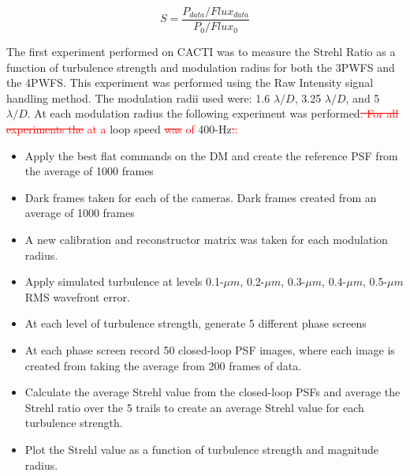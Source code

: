 \documentclass[12pt]{spieman}  %
\newcommand{\jrmadd}[1]{\textcolor{red}{#1}}
\newcommand{\jrmrmv}[1]{\textcolor{red}{\sout{#1}}}
\begin{document}
\begin{spacing}{2}
\begin{equation}
    S=\frac{P_{data}/Flux_{data}}{P_{0}/Flux_{0}}
    \label{Strehl}
\end{equation}

The first experiment performed on CACTI was to measure the Strehl Ratio as a function of turbulence strength and modulation radius for both the 3PWFS and the 4PWFS.  This experiment was performed using the Raw Intensity signal handling method. The modulation radii used were: 1.6 $\lambda/D$, 3.25 $\lambda/D$, and 5 $\lambda/D$. At each modulation radius the following experiment was performed\jrmrmv{. For all experiments the} \jrmadd{at a} loop speed \jrmrmv{was} \jrmadd{of} 400-Hz\jrmrmv{.}\jrmadd{:}

\begin{itemize}
    \item Apply the best flat commands on the DM and create the reference PSF from the average of 1000 frames
    \item Dark frames taken for each of the cameras. Dark frames created from an average of 1000 frames
    \item A new calibration and reconstructor matrix was taken for each modulation radius.
    \item Apply simulated turbulence at levels 0.1-$\mu m$, 0.2-$\mu m$, 0.3-$\mu m$, 0.4-$\mu m$, 0.5-$\mu m$ RMS wavefront error. 
    \item At each level of turbulence strength, generate 5 different phase screens
    \item At each phase screen record 50 closed-loop PSF images, where each image is created from taking the average from 200 frames of data. 
    \item Calculate the average Strehl value from the closed-loop PSFs and average the Strehl ratio over the 5 trails to create an average Strehl value for each turbulence strength.
    \item Plot the Strehl value as a function of turbulence strength and magnitude radius. 
    

    
\end{itemize}





	
 




\end{spacing}
\end{document}
